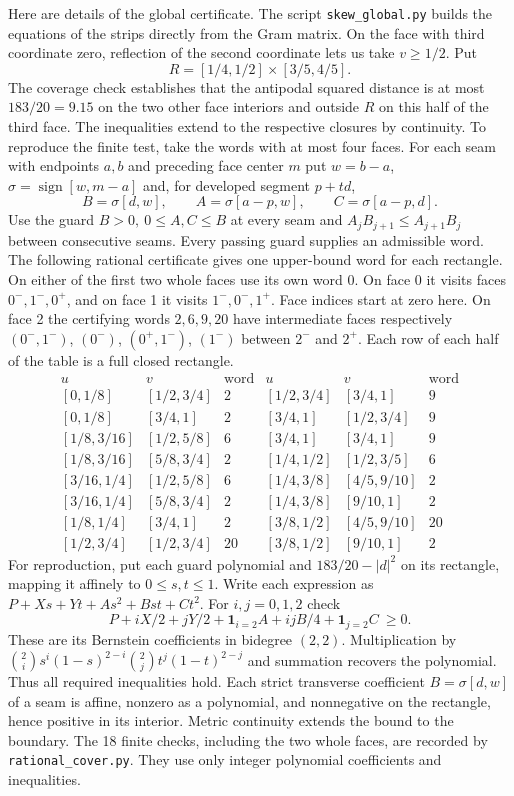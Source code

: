 \documentclass[10pt,letterpaper]{article}
\begin{document}
Here are details of the global certificate. The script
\texttt{skew\_global.py} builds the equations of the strips directly
from the Gram matrix. On the face with third coordinate zero, reflection
of the second coordinate lets us take $v\ge1/2$. Put
\[
 R=[1/4,1/2]\times[3/5,4/5].
\]
The coverage check establishes that the antipodal squared distance
is at most $183/20=9.15$ on the two other face interiors and outside
$R$ on this half of the third face. The inequalities extend to the
respective closures by continuity. To reproduce the finite test, take
the words with at most four faces. For each seam with endpoints $a,b$
and preceding face center $m$ put $w=b-a$,
$\sigma=\operatorname{sign}[w,m-a]$ and, for developed segment $p+td$,
\[
 B=\sigma[d,w],\qquad A=\sigma[a-p,w],\qquad C=\sigma[a-p,d].
\]
Use the guard $B>0,\ 0\le A,C\le B$ at every seam and
$A_jB_{j+1}\le A_{j+1}B_j$ between consecutive seams.
Every passing guard supplies an admissible word. The following
rational certificate gives one upper-bound word for each rectangle.
On either of the first two whole faces use its own word 0. On face 0
it visits faces $0^-,1^-,0^+$, and on face 1 it visits
$1^-,0^-,1^+$. Face indices start at zero here. On face 2 the
certifying words $2,6,9,20$ have intermediate faces respectively
$(0^-,1^-)$, $(0^-)$, $(0^+,1^-)$, $(1^-)$ between $2^-$ and $2^+$.
Each row of each half of the table is a full closed rectangle.
\[
\begin{array}{ccc|ccc}
 u&v&\text{word}&u&v&\text{word}\\ \hline
{}[0,1/8]&[1/2,3/4]&2 & [1/2,3/4]&[3/4,1]&9\\
{}[0,1/8]&[3/4,1]&2 & [3/4,1]&[1/2,3/4]&9\\
{}[1/8,3/16]&[1/2,5/8]&6 & [3/4,1]&[3/4,1]&9\\
{}[1/8,3/16]&[5/8,3/4]&2 & [1/4,1/2]&[1/2,3/5]&6\\
{}[3/16,1/4]&[1/2,5/8]&6 & [1/4,3/8]&[4/5,9/10]&2\\
{}[3/16,1/4]&[5/8,3/4]&2 & [1/4,3/8]&[9/10,1]&2\\
{}[1/8,1/4]&[3/4,1]&2 & [3/8,1/2]&[4/5,9/10]&20\\
{}[1/2,3/4]&[1/2,3/4]&20 & [3/8,1/2]&[9/10,1]&2
\end{array}
\]
For reproduction, put each guard polynomial and $183/20-|d|^2$ on its
rectangle, mapping it affinely to $0\le s,t\le1$. Write each expression
as $P+Xs+Yt+As^2+Bst+Ct^2$. For $i,j=0,1,2$ check
\[
 P+iX/2+jY/2+\mathbf 1_{i=2}A+ijB/4+\mathbf 1_{j=2}C\ \ge 0.
\]
These are its Bernstein coefficients in bidegree $(2,2)$. Multiplication
by $\binom{2}{i} s^i(1-s)^{2-i}\binom{2}{j} t^j(1-t)^{2-j}$ and summation
recovers the polynomial. Thus all required inequalities hold. Each
strict transverse coefficient $B=\sigma[d,w]$ of a seam is affine,
nonzero as a polynomial, and nonnegative on the rectangle, hence
positive in its interior. Metric continuity extends the bound to the
boundary. The 18 finite checks, including the two whole faces, are
recorded by \texttt{rational\_cover.py}. They use only integer
polynomial coefficients and inequalities.
\end{document}
